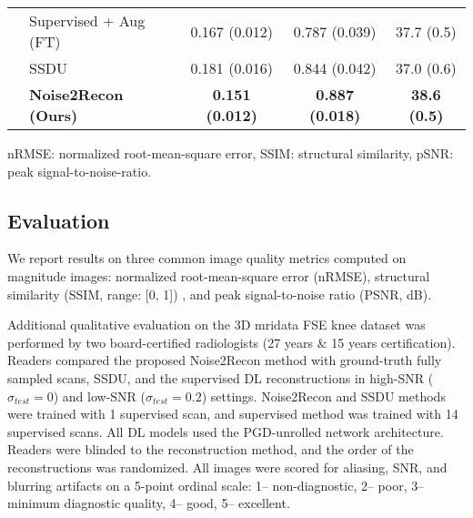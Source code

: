 \documentclass[10pt,twocolumn,letterpaper]{article}
\begin{document}
\begin{table}[t]
\begin{center}
{\begin{tabular}{llccc}
 & Supervised + Aug (FT) &  0.167 (0.012) &  0.787 (0.039) &  37.7 (0.5) \\
 & SSDU \cite{Yaman_self} &  0.181 (0.016) &  0.844 (0.042) &  37.0 (0.6) \\
  & \textbf{Noise2Recon (Ours)} &  \textbf{0.151 (0.012)} &  \textbf{0.887 (0.018)} &  \textbf{38.6 (0.5)} \\
\hline  %
\end{tabular}
}
nRMSE: normalized root-mean-square error, SSIM: structural similarity, pSNR: peak signal-to-noise-ratio.
\end{center}
\end{table}


\subsection{Evaluation}
We report results on three common image quality metrics computed on magnitude images: normalized root-mean-square error (nRMSE), structural similarity (SSIM, range: [0, 1]) \cite{wang2004image}, and peak signal-to-noise ratio (PSNR, dB).

Additional qualitative evaluation on the 3D mridata FSE knee dataset was performed by two board-certified  radiologists (27 years \& 15 years certification). Readers compared the proposed Noise2Recon method with ground-truth fully sampled scans, SSDU, and the supervised DL reconstructions in high-SNR ($\sigma_{test}=0$) and low-SNR ($\sigma_{test}=0.2$) settings. Noise2Recon and SSDU methods were trained with 1 supervised scan, and supervised method was trained with 14 supervised scans. All DL models used the PGD-unrolled network architecture. Readers were blinded to the reconstruction method, and the order of the reconstructions was randomized. All images were scored for aliasing, SNR, and blurring artifacts on a 5-point ordinal scale: 1-- non-diagnostic, 2-- poor, 3-- minimum diagnostic quality, 4-- good, 5-- excellent.
\end{document}

